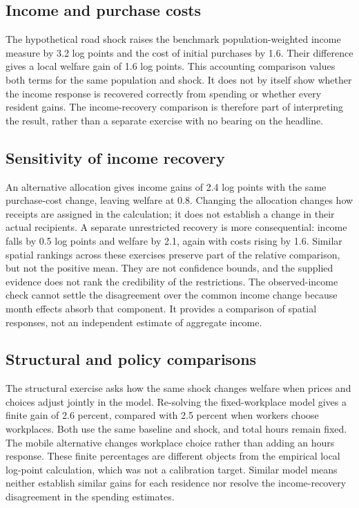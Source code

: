 \subsection{Income and purchase costs}
The hypothetical road shock raises the benchmark population-weighted income
measure by 3.2 log points and the cost of initial purchases by 1.6. Their difference
gives a local welfare gain of 1.6 log points. This accounting comparison values
both terms for the same population and shock. It does not by itself show whether
the income response is recovered correctly from spending or whether every
resident gains. The income-recovery comparison is therefore part of interpreting
the result, rather than a separate exercise with no bearing on the headline.

\subsection{Sensitivity of income recovery}
An alternative allocation gives income gains of 2.4 log points with the same
purchase-cost change, leaving welfare at 0.8. Changing the allocation changes
how receipts are assigned in the calculation; it does not establish a change in
their actual recipients. A separate unrestricted recovery is more consequential:
income falls by 0.5 log points and welfare by 2.1, again with costs rising by 1.6.
Similar spatial rankings across these exercises preserve part of the relative
comparison, but not the positive mean. They are not confidence bounds, and the
supplied evidence does not rank the credibility of the restrictions. The
observed-income check cannot settle the disagreement over the common income
change because month effects absorb that component. It provides a comparison
of spatial responses, not an independent estimate of aggregate income.

\subsection{Structural and policy comparisons}
The structural exercise asks how the same shock changes welfare when prices
and choices adjust jointly in the model. Re-solving the fixed-workplace model
gives a finite gain of 2.6 percent, compared with 2.5 percent when workers choose
workplaces. Both use the same baseline and shock, and total hours remain fixed.
The mobile alternative changes workplace choice rather than adding an hours
response. These finite percentages are different objects from the empirical
local log-point calculation, which was not a calibration target. Similar model
means neither establish similar gains for each residence nor resolve the
income-recovery disagreement in the spending estimates.

